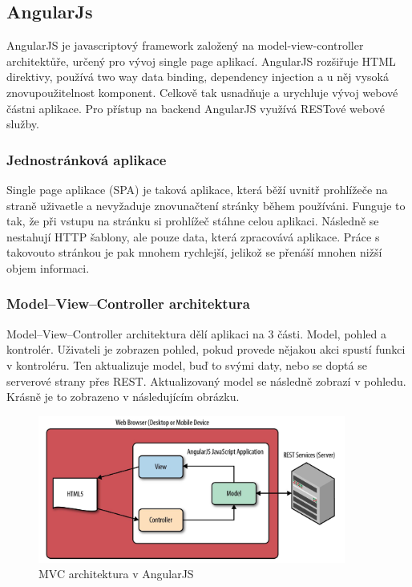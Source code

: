\documentclass[czech,master,public,dept460,male,cpdeclaration,twoside]{diploma}
\begin{document}
\subsection{AngularJs}
AngularJS je javascriptový framework založený na model-view-controller architektůře, určený pro vývoj single page aplikací. AngularJS rozšiřuje HTML direktivy, používá two way data binding, dependency injection a u něj vysoká znovupoužitelnost komponent. Celkově tak usnadňuje a urychluje vývoj webové částni aplikace. Pro přístup na backend AngularJS využívá RESTové webové služby. \cite{coJeAngular}

\subsubsection{Jednostránková aplikace}
Single page aplikace (SPA) je taková aplikace, která běží uvnitř prohlížeče na straně uživaetle a nevyžaduje znovunačtení stránky během používáni. Funguje to tak, že při vstupu na stránku si prohlížeč stáhne celou aplikaci. Následně se nestahují HTTP šablony, ale pouze data, která zpracovává aplikace. Práce s takovouto stránkou je pak mnohem rychlejší, jelikož se přenáší mnohen nižší objem informaci. \cite{SPA}

\subsubsection{Model–View–Controller architektura}
Model–View–Controller architektura dělí aplikaci na 3 části. Model, pohled a kontrolér. Uživateli je zobrazen pohled, pokud provede nějakou akci spustí funkci v kontroléru. Ten aktualizuje model, buď to svými daty, nebo se doptá se serverové strany přes REST. Aktualizovaný model se následně zobrazí v pohledu. Krásně je to zobrazeno v následujícím obrázku.
\begin{figure}[H]
\centering\includegraphics[width=0.9\textwidth]{Figures/MVC.png}\caption{MVC architektura v AngularJS}
\end{figure}
\end{document}
